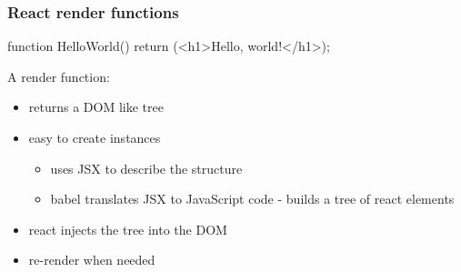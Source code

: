 \begin{frame}[fragile] \frametitle{React render functions}
\begin{CodeBox}{}
function HelloWorld() {
  return (<h1>Hello, world!</h1>);
}
\end{CodeBox}

\vspace{8mm}
A render function:
\begin{itemize}
  \item returns a DOM like tree
  \item easy to create instances
  \begin{itemize}
    \item uses JSX to describe the structure
    \item babel translates JSX to JavaScript code - builds a tree of react elements
  \end{itemize}
  \item react injects the tree into the DOM
  \item re-render when needed
\end{itemize}

\end{frame}


